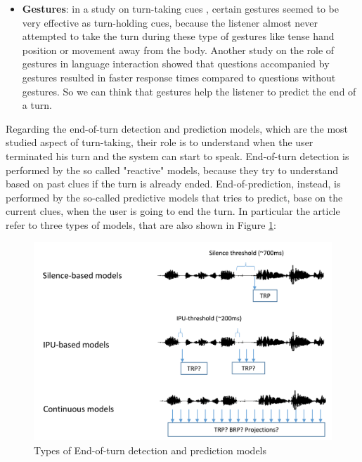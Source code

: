 \documentclass[../main.tex]{subfiles}
\begin{document}
\begin{itemize}
\item \textbf{Gestures}: in a study on turn-taking cues \cite{duncan1972some}, certain gestures seemed to be very effective as turn-holding cues, because the listener almost never attempted to take the turn during these type of gestures like tense hand position or movement away from the body. Another study on the role of gestures in language interaction \cite{holler2018processing} showed that questions accompanied by gestures resulted in faster response times compared to questions without gestures. So we can think that gestures help the listener to predict the end of a turn.

\end{itemize}

Regarding the end-of-turn detection and prediction models, which are the most studied aspect of turn-taking, their role is to understand when the user terminated his turn and the system can start to speak. End-of-turn detection is performed by the so called "reactive" models, because they try to understand based on past clues if the turn is already ended. End-of-prediction, instead, is performed by the so-called predictive models that tries to predict, base on the current clues, when the user is going to end the turn. In particular the article refer to three types of models, that are also shown in Figure \ref{fig:models}: 

\begin{figure}[ht]
    \centering
    \includegraphics[width=\textwidth]{images/Turn-taking_models.png}
    \caption{Types of End-of-turn detection and prediction models \cite{skantze2021turn}}
    \label{fig:models}
\end{figure}
\end{document}
